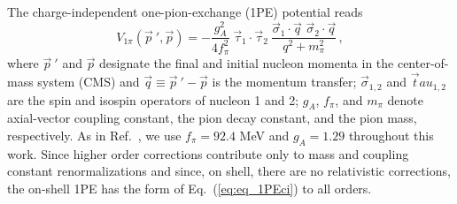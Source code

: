 The charge-independent one-pion-exchange (1PE) potential reads
\begin{equation}
V_{1\pi} ({\vec p}~', \vec p) = - 
\frac{g_A^2}{4f_\pi^2}
\: 
{\vec \tau}_1 \cdot {\vec \tau}_2 
\:
\frac{
\vec \sigma_1 \cdot \vec q \,\, \vec \sigma_2 \cdot \vec q}
{q^2 + m_\pi^2} 
\,,
\label{eq:eq_1PEci}
\end{equation}
where ${\vec p}~'$ and $\vec p$ designate the final and initial
nucleon momenta in the center-of-mass system (CMS) and $\vec q \equiv
{\vec p}~' - \vec p$ is the momentum transfer; $\vec \sigma_{1,2}$ and
$\vec tau_{1,2}$ are the spin and isospin operators of nucleon 1 and
2; $g_A$, $f_\pi$, and $m_\pi$ denote axial-vector coupling constant,
the pion decay constant, and the pion mass, respectively. As in Ref.~\cite{carlsson2014}, we use
$f_\pi=92.4$ MeV and $g_A=1.29$ throughout this work.  
Since higher order corrections contribute only to mass
and coupling constant renormalizations and since, on shell, there are
no relativistic corrections, the on-shell 1PE has the form
of Eq.~(\ref{eq:eq_1PEci}) to all orders.

